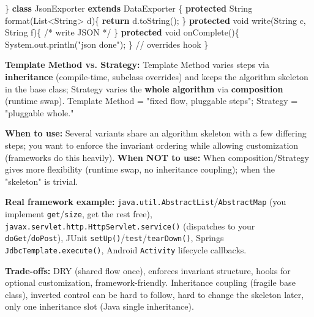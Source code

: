 \documentclass[11pt]{article}
\newenvironment{Shaded}{\begin{snugshade}}{\end{snugshade}}
\newcommand{\BuiltInTok}[1]{\textcolor[rgb]{0.50,0.55,0.55}{#1}}
\newcommand{\CommentTok}[1]{\textcolor[rgb]{0.48,0.49,0.49}{#1}}
\newcommand{\ControlFlowTok}[1]{\textcolor[rgb]{0.99,0.74,0.29}{\textbf{#1}}}
\newcommand{\DataTypeTok}[1]{\textcolor[rgb]{0.16,0.50,0.73}{#1}}
\newcommand{\FunctionTok}[1]{\textcolor[rgb]{0.56,0.27,0.68}{#1}}
\newcommand{\KeywordTok}[1]{\textcolor[rgb]{0.81,0.81,0.76}{\textbf{#1}}}
\newcommand{\NormalTok}[1]{\textcolor[rgb]{0.81,0.81,0.76}{#1}}
\newcommand{\OperatorTok}[1]{\textcolor[rgb]{0.81,0.81,0.76}{#1}}
\newcommand{\StringTok}[1]{\textcolor[rgb]{0.96,0.31,0.31}{#1}}
\begin{document}
\begin{Shaded}
\begin{Highlighting}[]
\OperatorTok{\}}
\KeywordTok{class}\NormalTok{ JsonExporter }\KeywordTok{extends}\NormalTok{ DataExporter }\OperatorTok{\{}
    \KeywordTok{protected} \BuiltInTok{String} \FunctionTok{format}\OperatorTok{(}\BuiltInTok{List}\OperatorTok{\textless{}}\BuiltInTok{String}\OperatorTok{\textgreater{}}\NormalTok{ d}\OperatorTok{)\{} \ControlFlowTok{return}\NormalTok{ d}\OperatorTok{.}\FunctionTok{toString}\OperatorTok{();} \OperatorTok{\}}
    \KeywordTok{protected} \DataTypeTok{void} \FunctionTok{write}\OperatorTok{(}\BuiltInTok{String}\NormalTok{ c}\OperatorTok{,} \BuiltInTok{String}\NormalTok{ f}\OperatorTok{)\{} \CommentTok{/* write JSON */} \OperatorTok{\}}
    \KeywordTok{protected} \DataTypeTok{void} \FunctionTok{onComplete}\OperatorTok{()\{} \BuiltInTok{System}\OperatorTok{.}\FunctionTok{out}\OperatorTok{.}\FunctionTok{println}\OperatorTok{(}\StringTok{"json done"}\OperatorTok{);} \OperatorTok{\}}  \CommentTok{// overrides hook}
\OperatorTok{\}}
\end{Highlighting}
\end{Shaded}

\textbf{Template Method vs. Strategy:} Template Method varies steps via \textbf{inheritance} (compile-time, subclass overrides) and keeps the algorithm skeleton in the base class; Strategy varies the \textbf{whole algorithm} via \textbf{composition} (runtime swap). Template Method = "fixed flow, pluggable steps"; Strategy = "pluggable whole."

\textbf{When to use:} Several variants share an algorithm skeleton with a few differing steps; you want to enforce the invariant ordering while allowing customization (frameworks do this heavily). \textbf{When NOT to use:} When composition/Strategy gives more flexibility (runtime swap, no inheritance coupling); when the "skeleton" is trivial.

\textbf{Real framework example:} \texttt{java.util.AbstractList}/\texttt{AbstractMap} (you implement \texttt{get}/\texttt{size}, get the rest free), \texttt{javax.servlet.http.HttpServlet.service()} (dispatches to your \texttt{doGet}/\texttt{doPost}), JUnit \texttt{setUp()}/\texttt{test}/\texttt{tearDown()}, Spring\textquotesingle s \texttt{JdbcTemplate.execute()}, Android \texttt{Activity} lifecycle callbacks.

\textbf{Trade-offs:} DRY (shared flow once), enforces invariant structure, hooks for optional customization, framework-friendly. Inheritance coupling (fragile base class), inverted control can be hard to follow, hard to change the skeleton later, only one inheritance slot (Java single inheritance).
\end{document}
